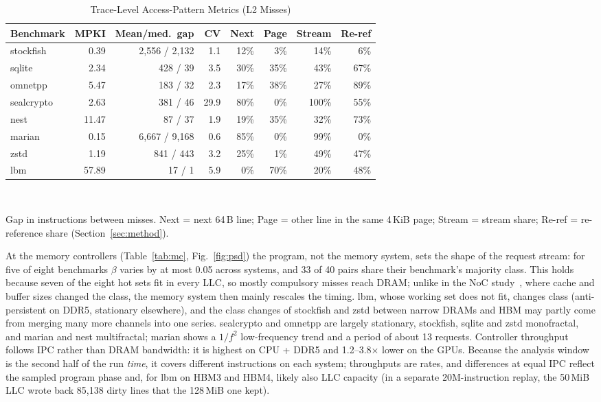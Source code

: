 \documentclass[conference]{IEEEtran}
\newcommand{\tmx}{\ensuremath{\times}}
\begin{document}
\begin{table}[t]
\caption{Trace-Level Access-Pattern Metrics (L2 Misses)}
\label{tab:pattern}
\centering
\footnotesize
\setlength{\tabcolsep}{2.2pt}
\begin{tabular}{@{}lrrrrrrr@{}}
\toprule
Benchmark & MPKI & Mean/med.\ gap & CV & Next & Page & Stream & Re-ref\\
\midrule
stockfish & 0.39 & 2,556 / 2,132 & 1.1 & 12\% & 3\% & 14\% & 6\%\\
sqlite & 2.34 & 428 / 39 & 3.5 & 30\% & 35\% & 43\% & 67\%\\
omnetpp & 5.47 & 183 / 32 & 2.3 & 17\% & 38\% & 27\% & 89\%\\
sealcrypto & 2.63 & 381 / 46 & 29.9 & 80\% & 0\% & 100\% & 55\%\\
nest & 11.47 & 87 / 37 & 1.9 & 19\% & 35\% & 32\% & 73\%\\
marian & 0.15 & 6,667 / 9,168 & 0.6 & 85\% & 0\% & 99\% & 0\%\\
zstd & 1.19 & 841 / 443 & 3.2 & 25\% & 1\% & 49\% & 47\%\\
lbm & 57.89 & 17 / 1 & 5.9 & 0\% & 70\% & 20\% & 48\%\\
\bottomrule
\end{tabular}\\[2pt]
\raggedright\scriptsize Gap in instructions between misses. Next = next 64\,B line; Page = other line in the same 4\,KiB page; Stream = stream share; Re-ref = re-reference share (Section~\ref{sec:method}).
\end{table}

At the memory controllers (Table~\ref{tab:mc}, Fig.~\ref{fig:psd}) the program, not the memory system, sets the shape of the request stream: for five of eight benchmarks $\beta$ varies by at most 0.05 across systems, and 33 of 40 pairs share their benchmark's majority class. This holds because seven of the eight hot sets fit in every LLC, so mostly compulsory misses reach DRAM; unlike in the NoC study~\cite{agarwal2025}, where cache and buffer sizes changed the class, the memory system then mainly rescales the timing. lbm, whose working set does not fit, changes class (anti-persistent on DDR5, stationary elsewhere), and the class changes of stockfish and zstd between narrow DRAMs and HBM may partly come from merging many more channels into one series. sealcrypto and omnetpp are largely stationary, stockfish, sqlite and zstd monofractal, and marian and nest multifractal; marian shows a $1/f^2$ low-frequency trend and a period of about 13 requests. Controller throughput follows IPC rather than DRAM bandwidth: it is highest on CPU + DDR5 and 1.2--3.8\tmx{} lower on the GPUs. Because the analysis window is the second half of the run \emph{time}, it covers different instructions on each system; throughputs are rates, and differences at equal IPC reflect the sampled program phase and, for lbm on HBM3 and HBM4, likely also LLC capacity (in a separate 20M-instruction replay, the 50\,MiB LLC wrote back 85,138 dirty lines that the 128\,MiB one kept).
\end{document}
